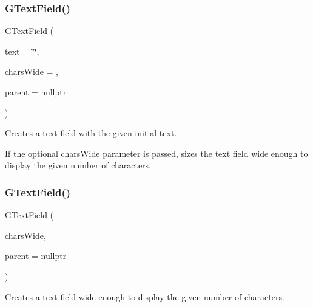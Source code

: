 \subsubsection{\texorpdfstring{G\+Text\+Field()}{GTextField()}\hspace{0.1cm}{\footnotesize\ttfamily [1/4]}}
{\footnotesize\ttfamily \mbox{\hyperlink{classGTextField}{G\+Text\+Field}} (\begin{DoxyParamCaption}\item[{const std\+::string \&}]{text = {\ttfamily \char`\"{}\char`\"{}},  }\item[{int}]{chars\+Wide = {},  }\item[{Q\+Widget $\ast$}]{parent = {\ttfamily nullptr} }\end{DoxyParamCaption})}



Creates a text field with the given initial text. 

If the optional chars\+Wide parameter is passed, sizes the text field wide enough to display the given number of characters. \mbox{\label{classGTextField_a036419be062e4f447008a78dae22921c}} 
\subsubsection{\texorpdfstring{G\+Text\+Field()}{GTextField()}\hspace{0.1cm}{\footnotesize\ttfamily [2/4]}}
{\footnotesize\ttfamily \mbox{\hyperlink{classGTextField}{G\+Text\+Field}} (\begin{DoxyParamCaption}\item[{int}]{chars\+Wide,  }\item[{Q\+Widget $\ast$}]{parent = {\ttfamily nullptr} }\end{DoxyParamCaption})}



Creates a text field wide enough to display the given number of characters. 

\mbox{\label{classGTextField_a4caf2f90e21e32abf032c99a8c3f8efb}} 

